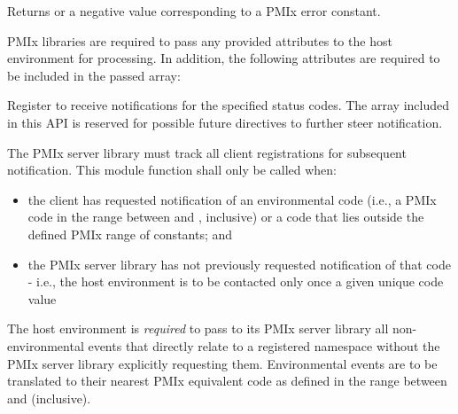 Returns  or a negative value corresponding to a PMIx error constant.

\reqattrstart
\ac{PMIx} libraries are required to pass any provided attributes to the host environment for processing. In addition, the following attributes are required to be included in the passed  array:


\reqattrend

\descr

Register to receive notifications for the specified status codes. The  array included in this API is reserved for possible future directives to further steer notification.


\adviceimplstart
The \ac{PMIx} server library must track all client registrations for subsequent notification. This module function shall only be called when:

\begin{itemize}
    \item the client has requested notification of an environmental code (i.e., a \ac{PMIx} code in the range between  and , inclusive) or a code that lies outside the defined \ac{PMIx} range of constants; and
    \item the \ac{PMIx} server library has not previously requested notification of that code - i.e., the host environment is to be contacted only once a given unique code value
\end{itemize}

\adviceimplend

\advicermstart
The host environment is \emph{required} to pass to its \ac{PMIx} server library all non-environmental events that directly relate to a registered namespace without the \ac{PMIx} server library explicitly requesting them. Environmental events are to be translated to their nearest \ac{PMIx} equivalent code as defined in the range between  and  (inclusive).
\advicermend


\subsection{}

\summary

